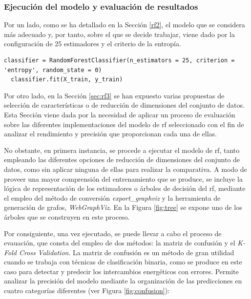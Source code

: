 \subsubsection{Ejecución del modelo y evaluación de resultados}
\label{sec:rf4}

Por un lado, como se ha detallado en la Sección \ref{rf2}, el modelo que se considera más adecuado y, por tanto, sobre el que se decide trabajar, viene dado por la configuración de 25 estimadores y el criterio de la entropía.

\vspace{3mm}

\begin{lstlisting}[style=Python, caption={Clasificador RF seleccionado}]
  classifier = RandomForestClassifier(n_estimators = 25, criterion = 'entropy', random_state = 0) 
  classifier.fit(X_train, y_train)
\end{lstlisting}
  
\vspace{3mm}

Por otro lado, en la Sección \ref{sec:rf3} se han expuesto varias propuestas de selección de características o de reducción de dimensiones del conjunto de datos. Esta Sección viene dada por la necesidad de aplicar un proceso de evaluación sobre las diferentes implementaciones del modelo de \gls{rf} seleccionado con el fin de analizar el rendimiento y precisión que proporcionan cada una de ellas. 

\vspace{3mm}

No obstante, en primera instancia, se procede a ejecutar el modelo de \gls{rf}, tanto empleando las diferentes opciones de reducción de dimensiones del conjunto de datos, como sin aplicar ninguna de ellas para realizar la comparativa. A modo de proveer una mayor comprensión del entrenamiento que se produce, se incluye la lógica de representación de los estimadores o árboles de decisión del \gls{rf}, mediante el empleo del método de conversión \textit{export\_graphviz} \cite{graphviz2} y la herramienta de generación de grafos, \textit{WebGraphViz}. En la Figura \ref{fig:tree} se expone uno de los árboles que se construyen en este proceso.

\vspace{3mm}

Por consiguiente, una vez ejecutado, se puede llevar a cabo el proceso de evauación, que consta del empleo de dos métodos: la matriz de confusión y el \textit{K-Fold Cross Validation}. La matriz de confusión \cite{cm} es un método de gran utilidad cuando se trabaja con técnicas de clasificación binaria, como se produce en este caso para detectar y predecir los intercambios energéticos con errores. Permite analizar la precisión del modelo mediante la organización de las predicciones en cuatro categorías diferentes (ver Figura \ref{fig:confusion}): 

